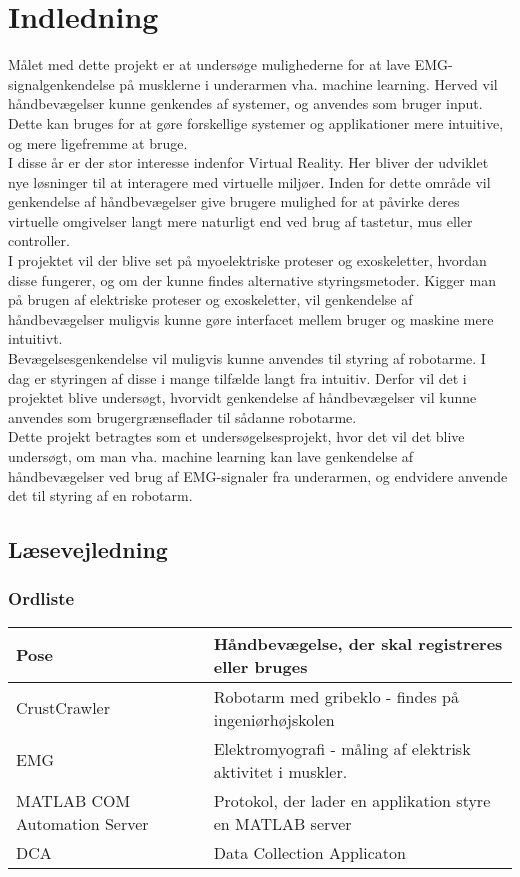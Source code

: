 \thispagestyle{fancy}
\chapter{Indledning}
\label{chp:indledning}
Målet med dette projekt er at undersøge mulighederne for at lave EMG-signalgenkendelse på musklerne i underarmen vha. machine learning. Herved vil håndbevægelser kunne genkendes af systemer, og anvendes som bruger input. Dette kan bruges for at gøre forskellige systemer og applikationer mere intuitive, og mere ligefremme at bruge.\\

I disse år er der stor interesse indenfor Virtual Reality. Her bliver der udviklet nye løsninger til at interagere med virtuelle miljøer. Inden for dette område vil genkendelse af håndbevægelser give brugere mulighed for at påvirke deres virtuelle omgivelser langt mere naturligt end ved brug af tastetur, mus eller controller.\\

I projektet vil der blive set på myoelektriske proteser og exoskeletter, hvordan disse fungerer, og om der kunne findes alternative styringsmetoder.
Kigger man på brugen af elektriske proteser og exoskeletter, vil genkendelse af håndbevægelser muligvis kunne gøre interfacet mellem bruger og maskine mere intuitivt.\\

Bevægelsesgenkendelse vil muligvis kunne anvendes til styring af robotarme. I dag er styringen af disse i mange tilfælde langt fra intuitiv. Derfor vil det i projektet blive undersøgt, hvorvidt genkendelse af håndbevægelser vil kunne anvendes som brugergrænseflader til sådanne robotarme. \\

Dette projekt betragtes som et undersøgelsesprojekt, hvor det vil det blive undersøgt, om man vha. machine learning kan lave genkendelse af håndbevægelser ved brug af EMG-signaler fra underarmen, og endvidere anvende det til styring af en robotarm.

\vfill

\section{Læsevejledning}
\subsection*{Ordliste}

\begin{tabular}{p{90pt}p{240pt}}
	Pose & Håndbevægelse, der skal registreres eller bruges\\ \hline
	CrustCrawler & Robotarm med gribeklo - findes på ingeniørhøjskolen\\ \hline
	EMG & Elektromyografi - måling af elektrisk aktivitet i muskler.\\ \hline
	MATLAB COM Automation Server & Protokol, der lader en applikation styre en MATLAB server\citep{RefWorks:5}\\ \hline
	DCA & Data Collection Applicaton\\
\end{tabular}
